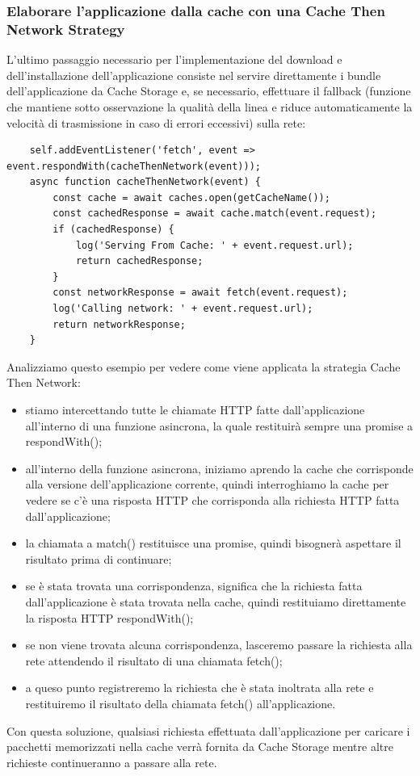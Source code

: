 \documentclass[italian]{article}
\begin{document}
\subsubsection{Elaborare l'applicazione dalla cache con una Cache Then Network Strategy}
L'ultimo passaggio necessario per l'implementazione del download e dell'installazione dell'applicazione consiste nel servire direttamente i bundle dell'applicazione da Cache Storage e, se necessario, effettuare il fallback (funzione che mantiene sotto osservazione la qualità della linea e riduce automaticamente la velocità di trasmissione in caso di errori eccessivi) sulla rete:
\begin{lstlisting}
	self.addEventListener('fetch', event => event.respondWith(cacheThenNetwork(event)));
	async function cacheThenNetwork(event) {
		const cache = await caches.open(getCacheName());
		const cachedResponse = await cache.match(event.request);
		if (cachedResponse) {
			log('Serving From Cache: ' + event.request.url);
			return cachedResponse;
		}
		const networkResponse = await fetch(event.request);
		log('Calling network: ' + event.request.url);	
		return networkResponse;
	}
\end{lstlisting}
Analizziamo questo esempio per vedere come viene applicata la strategia Cache Then Network:
\begin{itemize}
\item stiamo intercettando tutte le chiamate HTTP fatte dall'applicazione all'interno di una funzione asincrona, la quale restituirà sempre una promise a respondWith();
\item all'interno della funzione asincrona, iniziamo aprendo la cache che corrisponde alla versione dell'applicazione corrente, quindi interroghiamo la cache per vedere se c'è una risposta HTTP che corrisponda alla richiesta HTTP fatta dall'applicazione;
\item la chiamata a match() restituisce una promise, quindi bisognerà aspettare il risultato prima di continuare;
\item se è stata trovata una corrispondenza, significa che la richiesta fatta dall'applicazione è stata trovata nella cache, quindi restituiamo direttamente la risposta HTTP respondWith();
\item se non viene trovata alcuna corrispondenza, lasceremo passare la richiesta alla rete attendendo il risultato di una chiamata fetch();
\item a queso punto registreremo la richiesta che è stata inoltrata alla rete e restituiremo il risultato della chiamata fetch() all'applicazione.
\end{itemize}
Con questa soluzione, qualsiasi richiesta effettuata dall'applicazione per caricare i pacchetti memorizzati nella cache verrà fornita da Cache Storage mentre altre richieste continueranno a passare alla rete.
\end{document}

